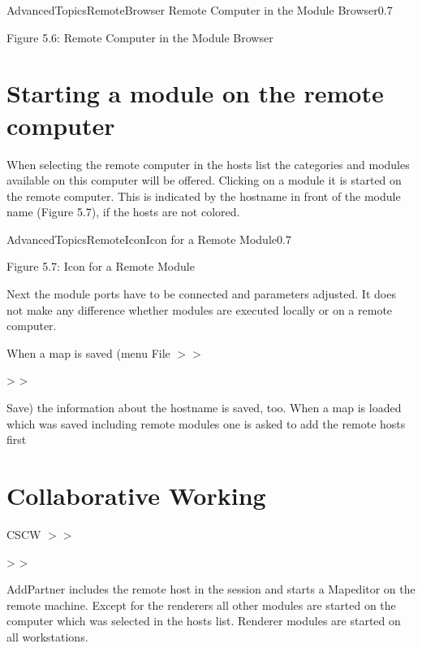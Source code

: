 \begin{covimg}{AdvancedTopics}{RemoteBrowser}
           {Remote Computer in the Module Browser}{0.7}\end{covimg}
\begin{htmlonly}
Figure 5.6: Remote Computer in the Module Browser
\vspace{1cm}
\end{htmlonly}

\clearpage
\section{Starting a module on the remote computer}


When selecting the remote computer in the hosts list the categories and modules 
available on this computer will be offered. Clicking on a module it is started on the 
remote computer. This is indicated by the hostname in front of the module 
name (Figure 5.7), if the hosts are not colored.

                              
\begin{covimg}{AdvancedTopics}{RemoteIcon}{Icon  for a Remote Module}{0.7}\end{covimg}
\begin{htmlonly}
Figure 5.7: Icon  for a Remote Module
\vspace{0.5cm}
\end{htmlonly}

Next the module ports have to be connected and parameters adjusted. It does not make 
any difference whether modules are executed locally or on a remote computer.

When a map is saved (menu File \latexonly $>>$ \endlatexonly \begin{htmlonly} > > \end{htmlonly} Save) the information about the hostname is 
saved, too. When a map is loaded which was saved including remote modules one is 
asked to add the remote hosts first


\section{Collaborative Working}


CSCW \latexonly $>>$ \endlatexonly \begin{htmlonly} > > \end{htmlonly} AddPartner includes the remote host in the session and starts a Mapeditor 
on the remote machine. Except for the renderers all other modules are started on the 
computer which was selected in the hosts list. Renderer modules are started on all 
workstations.

